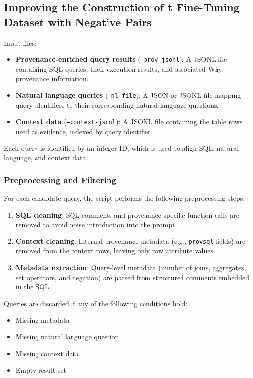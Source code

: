 \documentclass{article}
\begin{document}
\subsection{Improving the Construction of t Fine-Tuning Dataset with Negative Pairs}

Input files:

\begin{itemize}
    \item \textbf{Provenance-enriched query results} (\texttt{--prov-jsonl}):  
    A JSONL file containing SQL queries, their execution results, and associated Why-provenance information.
    
    \item \textbf{Natural language queries} (\texttt{--nl-file}):  
    A JSON or JSONL file mapping query identifiers to their corresponding natural language questions.
    
    \item \textbf{Context data} (\texttt{--context-jsonl}):  
    A JSONL file containing the table rows used as evidence, indexed by query identifier.
\end{itemize}

Each query is identified by an integer ID, which is used to align SQL, natural language, and context data.

\subsubsection{Preprocessing and Filtering}

For each candidate query, the script performs the following preprocessing steps:

\begin{enumerate}
    \item \textbf{SQL cleaning}:  
    SQL comments and provenance-specific function calls are removed to avoid noise introduction into the prompt.
    
    \item \textbf{Context cleaning}:  
    Internal provenance metadata (e.g., \texttt{provsql} fields) are removed from the context rows, leaving only raw attribute values.
    
    \item \textbf{Metadata extraction}:  
    Query-level metadata (number of joins, aggregates, set operators, and negation) are parsed from structured comments embedded in the SQL.
\end{enumerate}

Queries are discarded if any of the following conditions hold:
\begin{itemize}
    \item Missing metadata
    \item Missing natural language question
    \item Missing context data
    \item Empty result set
\end{itemize}
\end{document}
